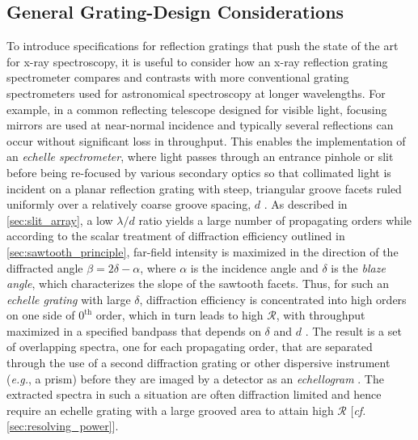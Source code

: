 \subsection{General Grating-Design Considerations}\label{sec:grating_tech_intro}
To introduce specifications for reflection gratings that push the state of the art for x-ray spectroscopy, it is useful to consider how an x-ray reflection grating spectrometer compares and contrasts with more conventional grating spectrometers used for astronomical spectroscopy at longer wavelengths. 
For example, in a common reflecting telescope designed for visible light, focusing mirrors are used at near-normal incidence and typically several reflections can occur without significant loss in throughput. 
This enables the implementation of an \emph{echelle spectrometer}, where light passes through an entrance pinhole or slit before being re-focused by various secondary optics so that collimated light is incident on a planar reflection grating with steep, triangular groove facets ruled uniformly over a relatively coarse groove spacing, $d$ \cite{Ryden10,Loewen97}. 
As described in \cref{sec:slit_array}, a low $\lambda / d$ ratio yields a large number of propagating orders while according to the scalar treatment of diffraction efficiency outlined in \cref{sec:sawtooth_principle}, far-field intensity is maximized in the direction of the diffracted angle $\beta = 2 \delta - \alpha$, where $\alpha$ is the incidence angle and $\delta$ is the \emph{blaze angle}, which characterizes the slope of the sawtooth facets. 
Thus, for such an \emph{echelle grating} with large $\delta$, diffraction efficiency is concentrated into high orders on one side of $0^{\text{th}}$ order, which in turn leads to high $\mathscr{R}$, with throughput maximized in a specified bandpass that depends on $\delta$ and $d$ \cite{Loewen97}. 
The result is a set of overlapping spectra, one for each propagating order, that are separated through the use of a second diffraction grating or other dispersive instrument (\emph{e.g.}, a prism) before they are imaged by a detector as an \emph{echellogram} \cite{Ryden10}. 
The extracted spectra in such a situation are often diffraction limited and hence require an echelle grating with a large grooved area to attain high $\mathscr{R}$ [\emph{cf.\@} \cref{sec:resolving_power}]. %

